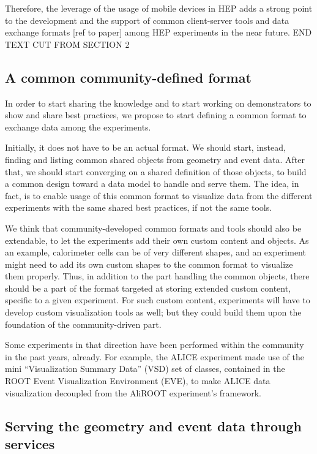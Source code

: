 \documentclass[12pt,a4paper]{article}
\begin{document}
Therefore, the leverage of the usage of mobile devices in HEP adds a strong point to the development and the support of common
client-server tools and data exchange formats [ref to paper] among HEP experiments in the near future.
END TEXT CUT FROM SECTION 2

\hypertarget{common-format}{%
\subsection{A common community-defined format}\label{common-format}}

In order to start sharing the knowledge and to start working on demonstrators to show and share best practices, we propose to
start defining a common format to exchange data among the experiments.

Initially, it does not have to be an actual format. We should start, instead, finding and listing common shared objects from geometry
and event data. After that, we should start converging on a shared definition of those objects, to build a common design toward
a data model to handle and serve them. The idea, in fact, is to enable usage of this common format to visualize data from the
different experiments with the same shared best practices, if not the same tools.

We think that community-developed common formats and tools should also be extendable, to let the experiments add their own
custom content and objects. As an example, calorimeter cells can be of very different shapes, and an experiment might need to
add its own custom shapes to the common format to visualize them properly. Thus, in addition to the part handling the common objects,
there should be a part of the format targeted at storing extended custom content, specific to a given experiment. For such
custom content, experiments will have to develop custom visualization tools as well; but they could build them upon the foundation
of the community-driven part.

Some experiments in that direction have been performed within the community in the past years, already. For example,
the ALICE experiment made use of the mini ``Visualization Summary Data'' (VSD) set of classes, contained in the ROOT Event
Visualization Environment (EVE), to make ALICE data visualization decoupled from the AliROOT experiment’s framework.

\hypertarget{serving-data}{%
\subsection{Serving the geometry and event data through services}\label{serving-data}}
\end{document}
